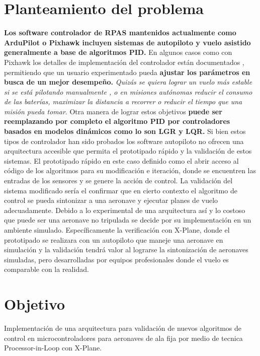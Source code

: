 \section{Planteamiento del problema}

\textbf{Los software controlador de RPAS mantenidos actualmente como ArduPilot o Pixhawk incluyen sistemas de autopiloto y vuelo asistido generalmente a base de algoritmos PID.} En algunos casos como con Pixhawk los detalles de implementación del controlador están documentados \cite{px4-control-diagram}, permitiendo que un usuario experimentado pueda \textbf{ajustar los parámetros en busca de un mejor desempeño.} \emph{Quizás se quiera lograr un vuelo más estable si se está pilotando manualmente \cite{betaflight-pid-tuning}, o en misiones autónomas reducir el consumo de las baterías, maximizar la distancia a recorrer o reducir el tiempo que una misión pueda tomar}. Otra manera de lograr estos objetivos \textbf{puede ser reemplazando por completo el algoritmo PID por controladores basados en modelos dinámicos como lo son LGR y LQR.} Si bien estos tipos de controlador han sido probados \cite{yt-lqr} los software autopiloto no ofrecen una arquitectura accesible que permita el prototipado rápido y la validación de estos sistemas. El prototipado rápido en este caso definido como el abrir acceso al código de los algoritmos para su modificación e iteración, donde se encuentren las entradas de los sensores y se genere la acción de control. La validación del sistema modificado sería el confirmar que en cierto contexto el algoritmo de control se pueda sintonizar a una aeronave y ejecutar planes de vuelo adecuadamente. Debido a lo experimental de una arquitectura así y lo costoso que puede ser una aeronave no tripulada se decide por su implementación en un ambiente simulado. Específicamente la verificación con X-Plane, donde el prototipado se realizara con un autopiloto que maneje una aeronave en simulación y la validación tendrá valor al lograrse la sintonización de aeronaves simuladas, pero desarrolladas por equipos profesionales donde el vuelo es comparable con la realidad.

\section{Objetivo}

Implementación de una arquitectura para validación de nuevos algoritmos de control en microcontroladores para aeronaves de ala fija por medio de tecnica Processor-in-Loop con X-Plane.

